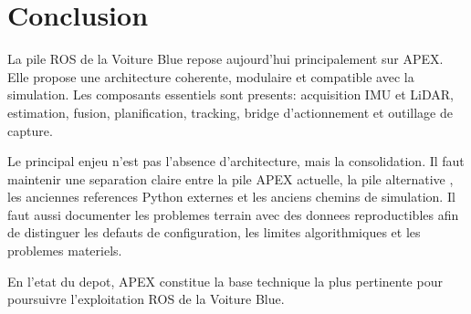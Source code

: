 \section{Conclusion}

La pile ROS de la Voiture Blue repose aujourd'hui principalement sur APEX. Elle propose une architecture coherente, modulaire et compatible avec la simulation. Les composants essentiels sont presents: acquisition IMU et LiDAR, estimation, fusion, planification, tracking, bridge d'actionnement et outillage de capture.

Le principal enjeu n'est pas l'absence d'architecture, mais la consolidation. Il faut maintenir une separation claire entre la pile APEX actuelle, la pile alternative , les anciennes references Python externes et les anciens chemins de simulation. Il faut aussi documenter les problemes terrain avec des donnees reproductibles afin de distinguer les defauts de configuration, les limites algorithmiques et les problemes materiels.

En l'etat du depot, APEX constitue la base technique la plus pertinente pour poursuivre l'exploitation ROS de la Voiture Blue.
